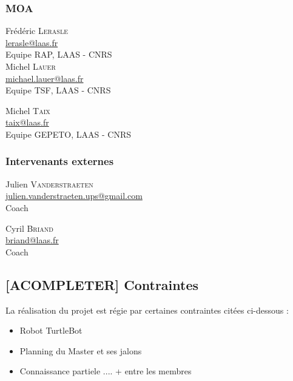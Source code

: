 \documentclass[10pt,a4paper]{article}
\begin{document}
\subsubsection{MOA}
\begin{minipage}[t]{0.46 \textwidth} 
Frédéric \textsc{Lerasle} \\
\href{mailto:lerasle@laas.fr}{lerasle@laas.fr} \\
Equipe RAP, LAAS - CNRS \\[0.3cm]
Michel \textsc{Lauer} \\
\href{mailto:michael.lauer@laas.fr}{michael.lauer@laas.fr} \\
Equipe TSF, LAAS - CNRS
\end{minipage} 
\hfill
\begin{minipage}[t]{0.46\textwidth} 
Michel \textsc{Taix} \\
\href{mailto:taix@laas.fr}{taix@laas.fr} \\
Equipe GEPETO, LAAS - CNRS
\end{minipage} 

\subsubsection{Intervenants externes}
\begin{minipage}[t]{0.46 \textwidth} 
Julien \textsc{Vanderstraeten} \\
\href{mailto:julien.vanderstraeten.ups@gmail.com
}{julien.vanderstraeten.ups@gmail.com} \\
Coach
\end{minipage} 
\hfill
\begin{minipage}[t]{0.46\textwidth} 
Cyril \textsc{Briand} \\
\href{mailto:briand@laas.fr}{briand@laas.fr} \\
Coach
\end{minipage} 

\subsection{[ACOMPLETER] Contraintes}
\noindent La réalisation du projet est régie par certaines contraintes citées ci-dessous : 
\begin{itemize}
\item Robot TurtleBot
\item Planning du Master et ses jalons 
\item Connaissance partiele .... + entre les membres

\end{itemize} 
\end{document}

